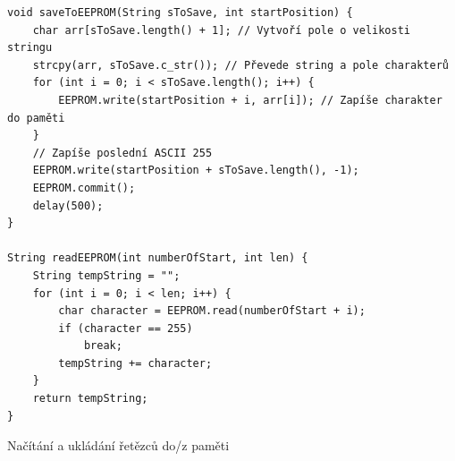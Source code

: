 \documentclass[a4paper, 12pt]{report}
\begin{document}
    \begin{listing}[]
        \begin{verbatim}
void saveToEEPROM(String sToSave, int startPosition) {
    char arr[sToSave.length() + 1]; // Vytvoří pole o velikosti stringu
    strcpy(arr, sToSave.c_str()); // Převede string a pole charakterů
    for (int i = 0; i < sToSave.length(); i++) {
        EEPROM.write(startPosition + i, arr[i]); // Zapíše charakter do paměti
    }
    // Zapíše poslední ASCII 255
    EEPROM.write(startPosition + sToSave.length(), -1);
    EEPROM.commit();
    delay(500);
}

String readEEPROM(int numberOfStart, int len) {
    String tempString = "";
    for (int i = 0; i < len; i++) {
        char character = EEPROM.read(numberOfStart + i);
        if (character == 255)
            break;
        tempString += character;
    }
    return tempString;
}
        \end{verbatim}
        \caption{Načítání a ukládání řetězců do/z paměti}
        \label{listing:eeprom}
    \end{listing}

    
    
\end{document}
